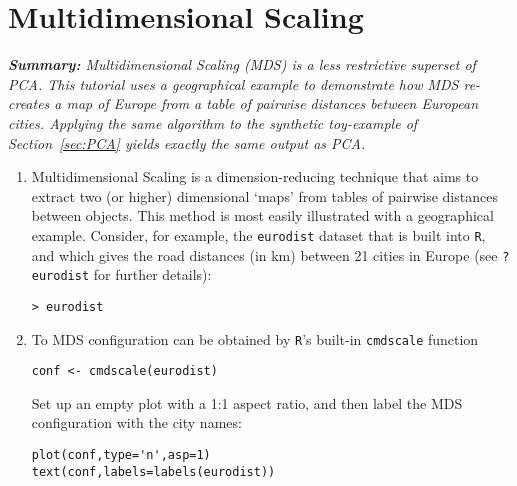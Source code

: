\documentclass[11pt]{article}
\begin{document}
\section{Multidimensional Scaling}
\label{sec:MDS}

\textit{\textbf{Summary:} Multidimensional Scaling (MDS) is a less
  restrictive superset of PCA. This tutorial uses a geographical
  example to demonstrate how MDS re-creates a map of Europe from a
  table of pairwise distances between European cities. Applying the
  same algorithm to the synthetic toy-example of Section~\ref{sec:PCA}
  yields exactly the same output as PCA.}

\begin{enumerate}

\item Multidimensional Scaling \citep[MDS,][]{young1938,
  torgerson1952, shepard1962, kruskal1978} is a dimension-reducing
  technique that aims to extract two (or higher) dimensional `maps'
  from tables of pairwise distances between objects. This method is
  most easily illustrated with a geographical example. Consider, for
  example, the \texttt{eurodist} dataset that is built into
  \texttt{R}, and which gives the road distances (in km) between 21
  cities in Europe (see \texttt{?eurodist} for further details):

\begin{verbatim}
> eurodist
\end{verbatim}

\item To MDS configuration can be obtained by \texttt{R}'s built-in
  \texttt{cmdscale} function
  
\begin{verbatim}
conf <- cmdscale(eurodist)
\end{verbatim}

Set up an empty plot with a 1:1 aspect ratio, and then label the MDS
configuration with the city names:

\begin{verbatim}
plot(conf,type='n',asp=1)
text(conf,labels=labels(eurodist))
\end{verbatim}


\end{enumerate}
\end{document}
